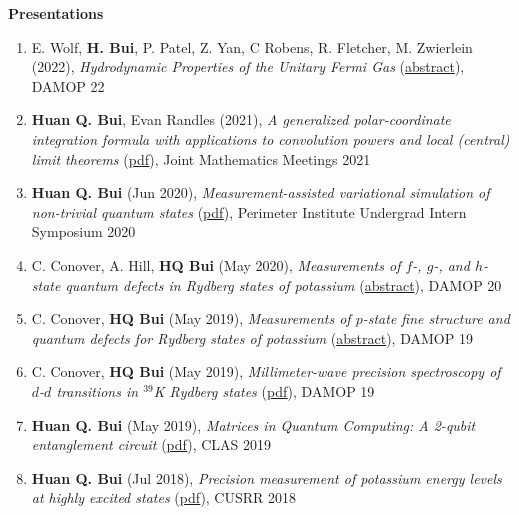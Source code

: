 \documentclass[10pt]{article}
\begin{document}

\noindent \large{\textbf{{Presentations}}}  \normalsize 

\begin{enumerate}
	\setlength\itemsep{-0pt}
	\item E. Wolf, \textbf{H. Bui}, P. Patel, Z. Yan, C Robens, R. Fletcher, M. Zwierlein (2022), \textit{Hydrodynamic Properties of the Unitary Fermi Gas} (\href{https://meetings.aps.org/Meeting/DAMOP22/Session/N01.49}{abstract}), DAMOP 22
	
	\item \textbf{Huan Q. Bui}, Evan Randles (2021), \textit{A generalized polar-coordinate integration formula with applications to convolution powers and local (central) limit theorems} (\href{https://jointmathematicsmeetings.org/amsmtgs/2247_abstracts/1163-42-1122.pdf}{{pdf}}), Joint Mathematics Meetings 2021
	
	\item \textbf{Huan Q. Bui} (Jun 2020), \textit{Measurement-assisted variational simulation of non-trivial quantum states} (\href{https://huanqbui.com/LaTeX 20projects/HuanBui_Perimeter/Presentation/MBQC_as_Simulation.pdf}{{pdf}}), Perimeter Institute Undergrad Intern Symposium 2020
	
	\item C. Conover, A. Hill, \textbf{HQ Bui} (May 2020), \textit{Measurements of $f$-, $g$-, and $h$-state quantum defects in Rydberg states of potassium} (\href{http://meetings.aps.org/Meeting/DAMOP20/Session/K01.17}{abstract}),  DAMOP 20
	
	\item C. Conover, \textbf{HQ Bui} (May 2019), \textit{Measurements of $p$-state fine structure and quantum defects for Rydberg states of potassium} (\href{https://ui.adsabs.harvard.edu/abs/2019APS..DMPL01169C/abstract}{{abstract}}), DAMOP 19
	
	\item C. Conover, \textbf{HQ Bui} (May 2019), \textit{Millimeter-wave precision spectroscopy of $d$-$d$ transitions in $^{\text{39}}$K Rydberg states} (\href{https://huanqbui.com/research/DAMOP19 20poster/DAMOP19.pdf}{{pdf}}), DAMOP 19
	
	\item \textbf{Huan Q. Bui} (May 2019), \textit{Matrices in Quantum Computing: A 2-qubit entanglement circuit} (\href{https://huanqbui.com/LaTeX 20projects/Matrix_Analysis/CLAS 202019/Quantum-Circuit.pdf}{{pdf}}), CLAS 2019
	
	\item \textbf{Huan Q. Bui} (Jul 2018), \textit{Precision measurement of potassium energy levels at highly excited states} (\href{https://huanqbui.com/research/CUSRR2018.pdf}{{pdf}}), CUSRR 2018
\end{enumerate}
\end{document}
